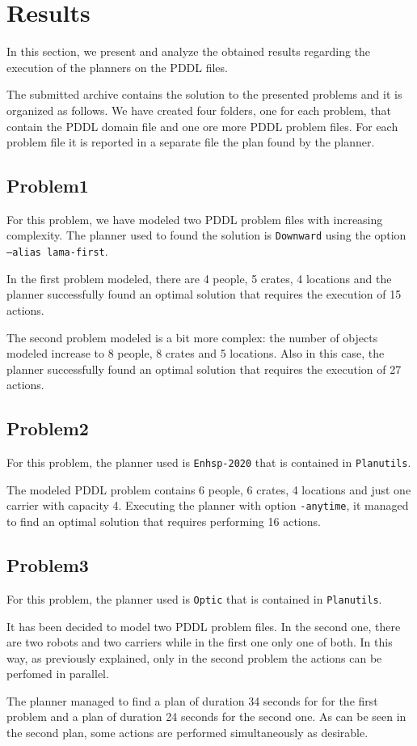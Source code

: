\section{Results}
\label{sec4}
In this section, we present and analyze the obtained results regarding the execution of the planners on 
the PDDL files.

The submitted archive contains the solution to the presented problems and it is organized as follows.
We have created four folders, one for each problem, that contain the PDDL domain file and one ore more 
PDDL problem files. For each problem file it is reported in a separate file the plan found by the planner.


\subsection{Problem1}
For this problem, we have modeled two PDDL problem files with increasing complexity.
The planner used to found the solution is \texttt{Downward} using the option \texttt{--alias lama-first}.

In the first problem modeled, there are 4 people, 5 crates, 4 locations and the planner successfully
found an optimal solution that requires the execution of 15 actions.

The second problem modeled is a bit more complex: the number of objects modeled increase to 8 people, 
8 crates and 5 locations. Also in this case, the planner successfully
found an optimal solution that requires the execution of 27 actions.


\subsection{Problem2}
For this problem, the planner used is \texttt{Enhsp-2020} that is contained in \texttt{Planutils}.

The modeled PDDL problem contains 6 people, 6 crates, 4 locations and just one carrier with capacity 4.
Executing the planner with option \texttt{-anytime}, it managed to find an optimal solution that 
requires performing 16 actions.

\subsection{Problem3}
For this problem, the planner used is \texttt{Optic} that is contained in \texttt{Planutils}.

It has been decided to model two PDDL problem files.
In the second one, there are two robots and two carriers while in the first one only one of both.
In this way, as previously explained, only in the second problem the actions can be perfomed in parallel.

The planner managed to find a plan of duration 34 seconds for for the first problem and a plan of
duration 24 seconds for the second one.
As can be seen in the second plan, some actions are performed simultaneously as desirable.

